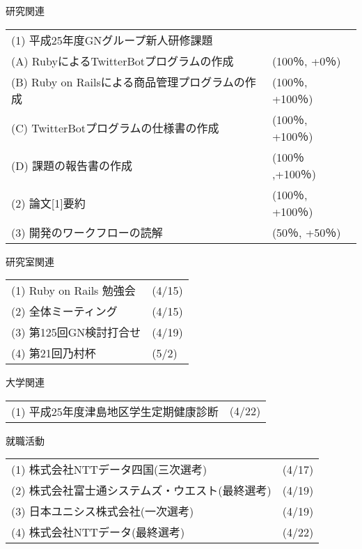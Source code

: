 \documentclass[fleqn, 14pt]{extarticlej}
\begin{document}
\begin{description}
\itemsep -1mm

  \item[　1.1] 研究関連
  
    \begin{tabular}{p{11.8cm}l}
      (1) 平成25年度GNグループ新人研修課題 \\
		\hspace{0.5zw}(A) RubyによるTwitterBotプログラムの作成 &(100％, +0％) \\
		\hspace{0.5zw}(B) Ruby on Railsによる商品管理プログラムの作成&(100％, +100％) \\
        \hspace{0.5zw}(C) TwitterBotプログラムの仕様書の作成 &(100％, +100％) \\
        \hspace{0.5zw}(D) 課題の報告書の作成&(100％ ,+100％) \\
      (2) 論文[1]要約 &(100％, +100％)\\
	  (3) 開発のワークフローの読解 &(50％, +50％)

    \end{tabular}

  \item[　1.2] 研究室関連
  
    \begin{tabular}{p{11.8cm}l}
      (1) Ruby on Rails 勉強会&(4/15)\\
	  (2) 全体ミーティング&(4/15)\\
      (3) 第125回GN検討打合せ & (4/19)\\
      (4) 第21回乃村杯 & (5/2)\\

    \end{tabular}

  \item[　1.3] 大学関連
  
    \begin{tabular}{p{11.8cm}l}
      (1) 平成25年度津島地区学生定期健康診断&(4/22)\\
     
    \end{tabular}
    
    \item[　1.4] 就職活動
    
	   \begin{tabular}{p{11.8cm}l}
		 (1) 株式会社NTTデータ四国(三次選考)&(4/17)\\
		 (2) 株式会社富士通システムズ・ウエスト(最終選考)&(4/19)\\
		 (3) 日本ユニシス株式会社(一次選考)&(4/19)\\
		 (4) 株式会社NTTデータ(最終選考)&(4/22)\\
		 
       \end{tabular}

\end{description}
\end{document}
